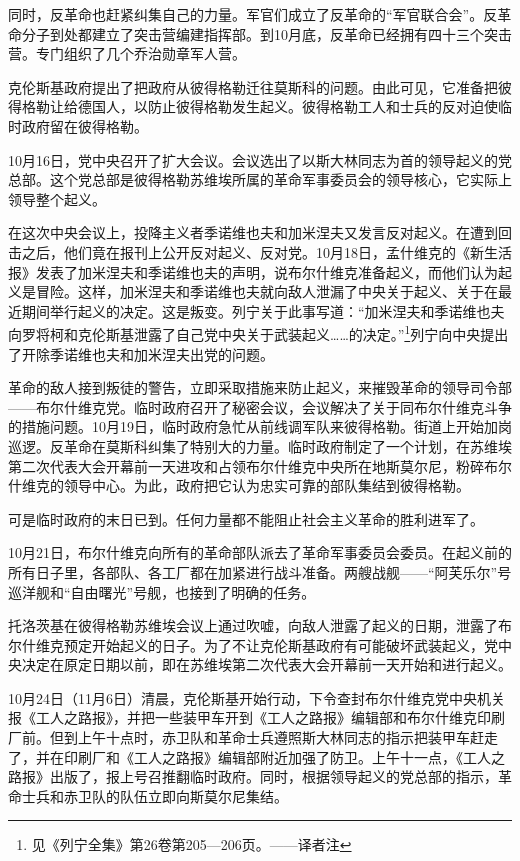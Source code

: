 同时，反革命也赶紧纠集自己的力量。军官们成立了反革命的“军官联合会”。反革命分子到处都建立了突击营编建指挥部。到10月底，反革命已经拥有四十三个突击营。专门组织了几个乔治勋章军人营。

克伦斯基政府提出了把政府从彼得格勒迁往莫斯科的问题。由此可见，它准备把彼得格勒让给德国人，以防止彼得格勒发生起义。彼得格勒工人和士兵的反对迫使临时政府留在彼得格勒。

10月16日，党中央召开了扩大会议。会议选出了以斯大林同志为首的领导起义的党总部。这个党总部是彼得格勒苏维埃所属的革命军事委员会的领导核心，它实际上领导整个起义。

在这次中央会议上，投降主义者季诺维也夫和加米涅夫又发言反对起义。在遭到回击之后，他们竟在报刊上公开反对起义、反对党。10月18日，孟什维克的《新生活报》发表了加米涅夫和季诺维也夫的声明，说布尔什维克准备起义，而他们认为起义是冒险。这样，加米涅夫和季诺维也夫就向敌人泄漏了中央关于起义、关于在最近期间举行起义的决定。这是叛变。列宁关于此事写道：“加米涅夫和季诺维也夫向罗将柯和克伦斯基泄露了自己党中央关于武装起义……的决定。”\footnote{见《列宁全集》第26卷第205—206页。——译者注}列宁向中央提出了开除季诺维也夫和加米涅夫出党的问题。

革命的敌人接到叛徒的警告，立即采取措施来防止起义，来摧毁革命的领导司令部——布尔什维克党。临时政府召开了秘密会议，会议解决了关于同布尔什维克斗争的措施问题。10月19日，临时政府急忙从前线调军队来彼得格勒。街道上开始加岗巡逻。反革命在莫斯科纠集了特别大的力量。临时政府制定了一个计划，在苏维埃第二次代表大会开幕前一天进攻和占领布尔什维克中央所在地斯莫尔尼，粉碎布尔什维克的领导中心。为此，政府把它认为忠实可靠的部队集结到彼得格勒。

可是临时政府的末日已到。任何力量都不能阻止社会主义革命的胜利进军了。

10月21日，布尔什维克向所有的革命部队派去了革命军事委员会委员。在起义前的所有日子里，各部队、各工厂都在加紧进行战斗准备。两艘战舰——“阿芙乐尔”号巡洋舰和“自由曙光”号舰，也接到了明确的任务。

托洛茨基在彼得格勒苏维埃会议上通过吹嘘，向敌人泄露了起义的日期，泄露了布尔什维克预定开始起义的日子。为了不让克伦斯基政府有可能破坏武装起义，党中央决定在原定日期以前，即在苏维埃第二次代表大会开幕前一天开始和进行起义。

10月24日（11月6日）清晨，克伦斯基开始行动，下令查封布尔什维克党中央机关报《工人之路报》，并把一些装甲车开到《工人之路报》编辑部和布尔什维克印刷厂前。但到上午十点时，赤卫队和革命士兵遵照斯大林同志的指示把装甲车赶走了，并在印刷厂和《工人之路报》编辑部附近加强了防卫。上午十一点，《工人之路报》出版了，报上号召推翻临时政府。同时，根据领导起义的党总部的指示，革命士兵和赤卫队的队伍立即向斯莫尔尼集结。

